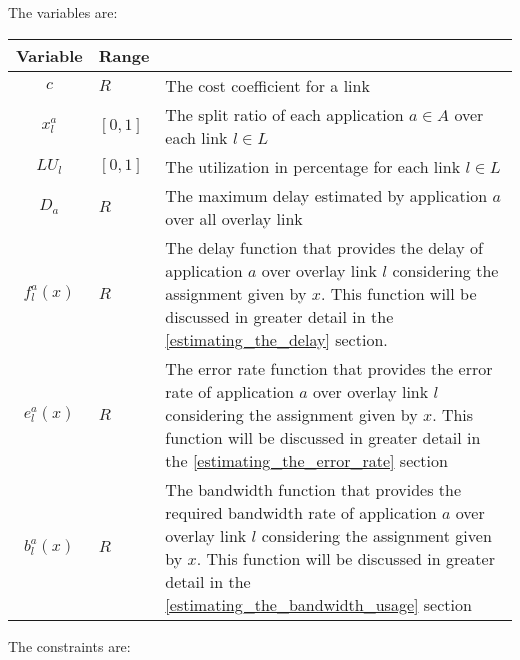 	The variables are:
	\begin{center}
		\begin{table}[htb]
			\centering
			\makegapedcells
			\begin{tabular}{|c|l|p{9cm}|}
				\hline
				Variable  & Range & \text{Notes}   \\ \hline
				$c$       & $R$ & The cost coefficient for a link   \\ \hline
				$x^a_l$       & $[0,1]$ & The split ratio of each application $a \in A$ over each link $l \in L$ \\ \hline
				$LU_l$       & $[0,1]$ & The utilization in percentage for each link $l \in L$ \\ \hline
				$D_a$       & $R$ & The maximum delay estimated by application $a$ over all overlay link \\ \hline
				$f^a_l(x)$       & $R$ & The delay function that provides the delay of application $a$ over overlay link $l$ considering the assignment given by $x$. This function will be discussed in greater detail in the \ref{estimating_the_delay} section.  \\ \hline
				$e^a_l(x)$       & $R$ & The error rate function that provides the error rate of application $a$ over overlay link $l$ considering the assignment given by $x$. This function will be discussed in greater detail in the \ref{estimating_the_error_rate} section \\ \hline
				$b^a_l(x)$       & $R$ & The bandwidth function that provides the required bandwidth rate of application $a$ over overlay link $l$ considering the assignment given by $x$. This function will be discussed in greater detail in the \ref{estimating_the_bandwidth_usage} section \\ \hline
			\end{tabular}
		\end{table}
	\end{center}
\pagebreak
The constraints are:

